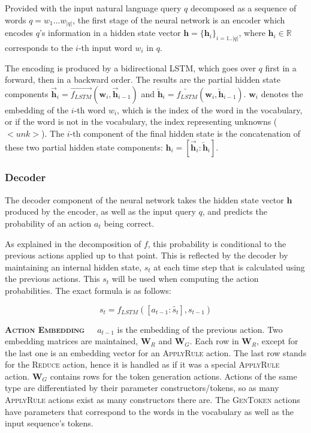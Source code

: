 \documentclass[12pt]{article}
\begin{document}
Provided with the input natural language query $q$ decomposed as a sequence of words $q = w_{1}...w_{|q|}$, the first stage of the neural network is an encoder which encodes $q$'s information in a hidden state vector $\mathbf{h} = \{\mathbf{h}_{i}\}_{i=1..|q|}$, where $\mathbf{h}_{i} \in \mathbb{R}$ corresponds to the $i$-th input word $w_{i}$ in $q$.

The encoding is produced by a bidirectional LSTM, which goes over $q$ first in a forward, then in a backward order. The results are the partial hidden state components $\overrightarrow{\mathbf{h}}_{i} = \overrightarrow{f_{LSTM}}(\mathbf{w}_{i}, \overrightarrow{\mathbf{h}}_{i-1})$ and $\overleftarrow{\mathbf{h}}_{i} = \overleftarrow{f_{LSTM}}(\mathbf{w}_{i}, \overleftarrow{\mathbf{h}}_{i-1})$. $\mathbf{w}_{i}$ denotes the embedding of the $i$-th word $w_{i}$, which is the index of the word in the vocabulary, or if the word is not in the vocabulary, the index representing unknowns ($<unk>$). The $i$-th component of the final hidden state is the concatenation of these two partial hidden state components: $\mathbf{h}_{i} = [\overrightarrow{\mathbf{h}}_{i} : \overleftarrow{\mathbf{h}}_{i}]$.

\subsubsection{Decoder}

The decoder component of the neural network takes the hidden state vector $\mathbf{h}$ produced by the encoder, as well as the input query $q$, and predicts the probability of an action $a_{t}$ being correct.

As explained in the decomposition of $f$, this probability is conditional to the previous actions applied up to that point. This is reflected by the decoder by maintaining an internal hidden state, $s_{t}$ at each time step that is calculated using the previous actions. This $s_{t}$ will be used when computing the action probabilities. The exact formula is as follows:

$$s_{t} = f_{LSTM}([a_{t-1} : \tilde{s_{t}}], s_{t-1})$$

\textbf{\textsc{Action Embedding}}\ \ \ $a_{t-1}$ is the embedding of the previous action. Two embedding matrices are maintained, $\textbf{W}_{R}$ and $\textbf{W}_{G}$. Each row in $\textbf{W}_{R}$, except for the last one is an embedding vector for an \textsc{ApplyRule} action. The last row stands for the \textsc{Reduce} action, hence it is handled as if it was a special \textsc{ApplyRule} action. $\textbf{W}_{G}$ contains rows for the token generation actions. Actions of the same type are differentiated by their parameter constructors/tokens, so as many \textsc{ApplyRule} actions exist as many constructors there are. The \textsc{GenToken} actions have parameters that correspond to the words in the vocabulary as well as the input sequence's tokens.
\end{document}
